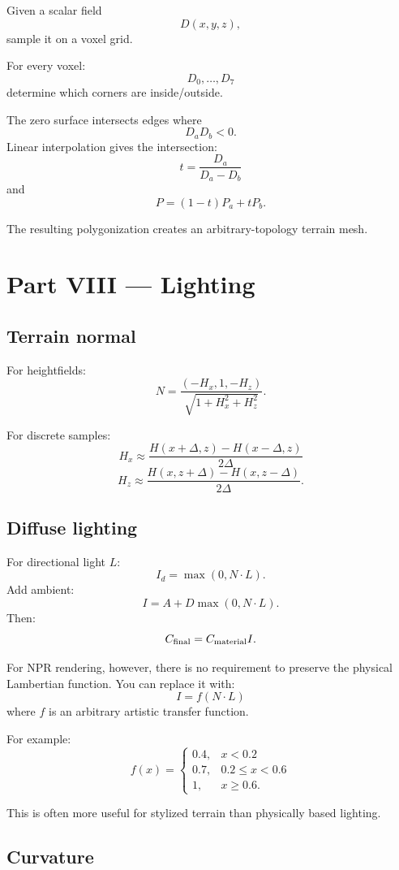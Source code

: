 \documentclass[12pt]{article}
\begin{document}
	Given a scalar field
	\[
	D(x,y,z),
	\]
	sample it on a voxel grid.
	
	For every voxel:
	\[
	D_0,\ldots,D_7
	\]
	determine which corners are inside/outside.
	
	The zero surface intersects edges where
	\[
	D_a D_b<0.
	\]
	Linear interpolation gives the intersection:
	\[
	\boxed{
		t= \frac{D_a}{D_a-D_b}
	}
	\]
	and
	\[
	\boxed{
		P=(1-t)P_a+tP_b.
	}
	\]
	
	The resulting polygonization creates an arbitrary-topology terrain mesh.
	
	\section*{Part VIII — Lighting}
	
	\subsection{Terrain normal}
	
	For heightfields:
	\[
	\boxed{
		N= \frac{(-H_x,1,-H_z)}{\sqrt{1+H_x^2+H_z^2}}.
	}
	\]
	
	For discrete samples:
	\[
	H_x\approx \frac{H(x+\Delta,z)-H(x-\Delta,z)}{2\Delta}
	\]
	\[
	H_z\approx \frac{H(x,z+\Delta)-H(x,z-\Delta)}{2\Delta}.
	\]
	
	\subsection{Diffuse lighting}
	
	For directional light $L$:
	\[
	\boxed{
		I_d= \max(0,N\cdot L).
	}
	\]
	Add ambient:
	\[
	\boxed{
		I= A+ D\max(0,N\cdot L).
	}
	\]
	Then:
	\[
	C_{\rm final}=C_{\rm material} I.
	\]
	
	For NPR rendering, however, there is no requirement to preserve the physical Lambertian function.
	You can replace it with:
	\[
	I=f(N\cdot L)
	\]
	where $f$ is an arbitrary artistic transfer function.
	
	For example:
	\[
	f(x)=
	\begin{cases}
		0.4,& x<0.2\\
		0.7,& 0.2\le x<0.6\\
		1,& x\ge0.6.
	\end{cases}
	\]
	
	This is often more useful for stylized terrain than physically based lighting.
	
	\subsection{Curvature}
	
\end{document}
